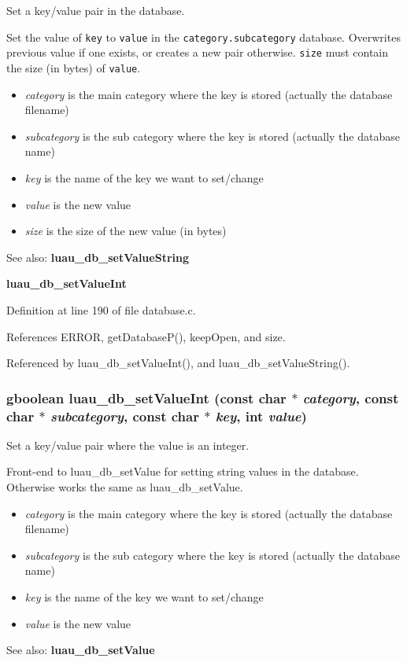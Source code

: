 Set a key/value pair in the database. 

Set the value of {\tt key} to {\tt value} in the {\tt category.subcategory} database. Overwrites previous value if one exists, or creates a new pair otherwise. {\tt size} must contain the size (in bytes) of {\tt value}.

\begin{itemize}
\item {\em category\/} is the main category where the key is stored (actually the database filename) \item {\em subcategory\/} is the sub category where the key is stored (actually the database name) \item {\em key\/} is the name of the key we want to set/change \item {\em value\/} is the new value \item {\em size\/} is the size of the new value (in bytes)\end{itemize}
\begin{Desc}
\item[See also:]{\bf luau\_\-db\_\-set\-Value\-String} 

{\bf luau\_\-db\_\-set\-Value\-Int} \end{Desc}


Definition at line 190 of file database.c.

References ERROR, get\-Database\-P(), keep\-Open, and size.

Referenced by luau\_\-db\_\-set\-Value\-Int(), and luau\_\-db\_\-set\-Value\-String().
\subsubsection{\setlength{\rightskip}{0pt plus 5cm}gboolean luau\_\-db\_\-set\-Value\-Int (const char $\ast$ {\em category}, const char $\ast$ {\em subcategory}, const char $\ast$ {\em key}, int {\em value})}\label{database_8c_a10}


Set a key/value pair where the value is an integer. 

Front-end to luau\_\-db\_\-set\-Value for setting string values in the database. Otherwise works the same as luau\_\-db\_\-set\-Value.

\begin{itemize}
\item {\em category\/} is the main category where the key is stored (actually the database filename) \item {\em subcategory\/} is the sub category where the key is stored (actually the database name) \item {\em key\/} is the name of the key we want to set/change \item {\em value\/} is the new value\end{itemize}
\begin{Desc}
\item[See also:]{\bf luau\_\-db\_\-set\-Value} \end{Desc}


